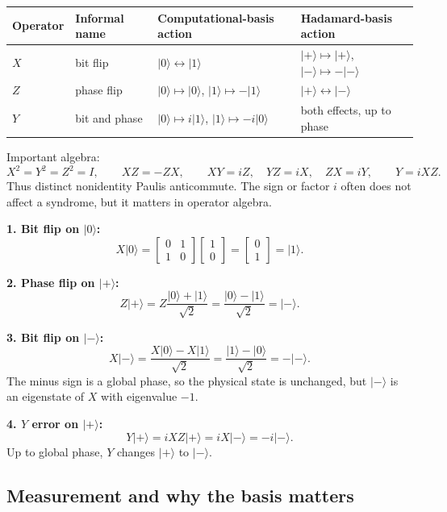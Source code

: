 \documentclass[11pt]{article}
\providecommand{\ket}[1]{\lvert #1\rangle}
\begin{document}
\begin{center}
\begin{tabular}{llll}
\toprule
Operator & Informal name & Computational-basis action & Hadamard-basis action \\
\midrule
\(X\) & bit flip & \(\ket{0}\leftrightarrow\ket{1}\) & \(\ket{+}\mapsto\ket{+}\), \(\ket{-}\mapsto-\ket{-}\) \\
\(Z\) & phase flip & \(\ket{0}\mapsto\ket{0}\), \(\ket{1}\mapsto-\ket{1}\) & \(\ket{+}\leftrightarrow\ket{-}\) \\
\(Y\) & bit and phase & \(\ket{0}\mapsto i\ket{1}\), \(\ket{1}\mapsto-i\ket{0}\) & both effects, up to phase \\
\bottomrule
\end{tabular}
\end{center}

Important algebra:
\[
X^2=Y^2=Z^2=I,\qquad XZ=-ZX,\qquad XY=iZ,\quad YZ=iX,\quad ZX=iY,
\qquad Y=iXZ.
\]
Thus distinct nonidentity Paulis anticommute. The sign or factor \(i\) often does not affect a
syndrome, but it matters in operator algebra.

\begin{workedbox}[title={Four state/error calculations}]
\textbf{1. Bit flip on \(\ket{0}\):}
\[
X\ket{0}=\begin{bmatrix}0&1\\1&0\end{bmatrix}
\begin{bmatrix}1\\0\end{bmatrix}=\begin{bmatrix}0\\1\end{bmatrix}=\ket{1}.
\]

\textbf{2. Phase flip on \(\ket{+}\):}
\[
Z\ket{+}=Z\frac{\ket{0}+\ket{1}}{\sqrt2}
=\frac{\ket{0}-\ket{1}}{\sqrt2}=\ket{-}.
\]

\textbf{3. Bit flip on \(\ket{-}\):}
\[
X\ket{-}=\frac{X\ket0-X\ket1}{\sqrt2}
=\frac{\ket1-\ket0}{\sqrt2}=-\ket{-}.
\]
The minus sign is a global phase, so the physical state is unchanged, but \(\ket{-}\) is an
eigenstate of \(X\) with eigenvalue \(-1\).

\textbf{4. \(Y\) error on \(\ket{+}\):}
\[
Y\ket{+}=iXZ\ket{+}=iX\ket{-}=-i\ket{-}.
\]
Up to global phase, \(Y\) changes \(\ket{+}\) to \(\ket{-}\).
\end{workedbox}

\subsection{Measurement and why the basis matters}
\end{document}
